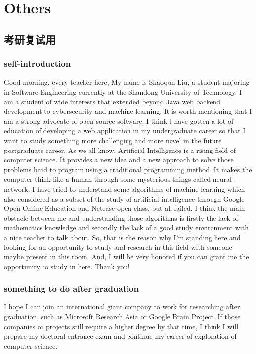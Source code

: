 \chapter{Others}
\section{考研复试用}
\subsection{self-introduction}
Good morning, every teacher here, My name is Shaoqun Liu, a student majoring in Software Engineering currently at the Shandong University of Technology. I am a student of wide interests that extended beyond Java web backend development to cybersecurity and machine learning. It is worth mentioning that I am a strong advocate of open-source software. I think I have gotten a lot of education of developing a web application in my undergraduate career so that I want to study something more challenging and more novel in the future postgraduate career. As we all know, Artificial Intelligence is a rising field of computer science. It provides a new idea and a new approach to solve those problems hard to program using a traditional programming method. It makes the computer think like a human through some mysterious things called neural-network. I have tried to understand some algorithms of machine learning which also considered as a subset of the study of artificial intelligence through Google Open Online Education and Netease open class, but all failed. I think the main obstacle between me and understanding those algorithms is firstly the lack of mathematics knowledge and secondly the lack of a good study environment with a nice teacher to talk about. So, that is the reason why I'm standing here and looking for an opportunity to study and research in this field with someone maybe present in this room. And, I will be very honored if you can grant me the opportunity to study in here. Thank you!

\subsection{something to do after graduation}
I hope I can join an international giant company to work for researching after graduation, such as Microsoft Research Asia or Google Brain Project. If those companies or projects still require a higher degree by that time, I think I will prepare my doctoral entrance exam and continue my career of exploration of computer science.

